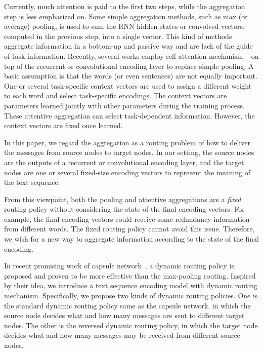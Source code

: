 \documentclass[11pt]{article}
\begin{document}
Currently, much attention is paid to the first two steps, while the aggregation step is less emphasized on.
Some simple aggregation methods, such as max (or average) pooling, is used to sum the RNN hidden states or convolved vectors, computed in the previous step, into a single vector. This kind of methods aggregate information in a bottom-up and passive way and are lack of the guide of task information.
Recently, several works employ self-attention mechanism ~\cite{lin2017structured,yang2016hierarchical} on top of the recurrent or convolutional encoding layer to replace simple pooling. A basic assumption is that the words (or even sentences) are not equally important. One or several task-specific context vectors are used to assign a different weight to each word and
select task-specific encodings. The context
vectors are parameters learned jointly with other parameters during the training process. These attentive aggregation can select task-dependent information. However, the context vectors are fixed once learned.



In this paper, we regard the aggregation as a routing problem of how to deliver the messages from source nodes to target nodes. In our setting, the source nodes are the outputs of a recurrent or convolutional encoding layer, and the target nodes are one or several fixed-size encoding vectors to represent the meaning of the text sequence.

From this viewpoint, both the pooling and attentive aggregations are a \textit{fixed} routing policy without considering the state of the final encoding vectors. For example, the final encoding vectors could receive some redundancy information from different words. The fixed routing policy cannot avoid this issue. Therefore, we wish for a new way to aggregate information according to the state of the final encoding.

In  recent promising work of capsule network~\cite{DBLP:conf/nips/SabourFH17}, a dynamic routing policy is proposed and proven to be more effective than the max-pooling routing. Inspired by their idea, we introduce a text sequence encoding model with dynamic routing mechanism. Specifically, we propose two kinds of dynamic routing policies. One is the standard dynamic routing policy same as the capsule network, in which the source node decides what and how many messages are sent to different target nodes. The other is the reversed dynamic routing policy, in which the target node decides what and how many messages may be received from different source nodes.
\end{document}
